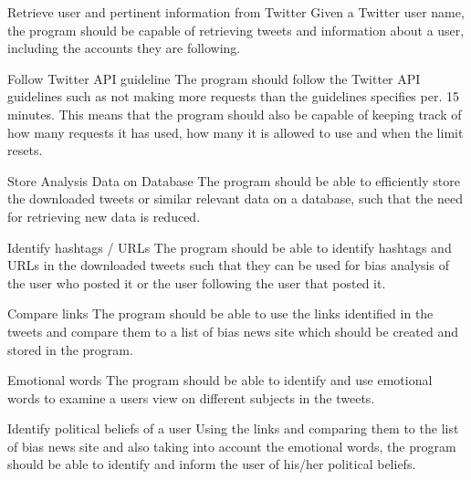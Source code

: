 \begin{requirement}{Retrieve user and pertinent information from Twitter}
Given a Twitter user name, the program should be capable of retrieving tweets
and information about a user, including the accounts they are following.
\end{requirement}

\begin{requirement}{Follow Twitter \ac{API} guideline}
The program should follow the Twitter \ac{API} guidelines such as not making
more requests than the guidelines specifies per. 15 minutes. This means that the
program should also be capable of keeping track of how many requests it has
used, how many it is allowed to use and when the limit resets.
\end{requirement}

\begin{requirement}{Store Analysis Data on Database}
The program should be able to efficiently store the downloaded tweets or
similar relevant data on a database, such that the need for retrieving new data
is reduced.
\end{requirement}

\begin{requirement}{Identify hashtags / \acsp{URL}}
The program should be able to identify hashtags and \acp{URL} in the downloaded
tweets such that they can be used for bias analysis of the user who posted it or
the user following the user that posted it.
\end{requirement}

\begin{requirement}{Compare links}
The program should be able to use the links identified in the tweets and compare
them to a list of bias news site which should be created and stored in the
program. 
\end{requirement}

\begin{requirement}{Emotional  words}
The program should be able to identify and use emotional words to examine a
users view on different subjects in the tweets. 
\end{requirement}

\begin{requirement}{Identify political beliefs of a user }
Using the links and comparing them to the list of bias news site and also taking
into account the emotional words, the program should be able to identify and
inform the user of his/her political beliefs. 
\end{requirement}



